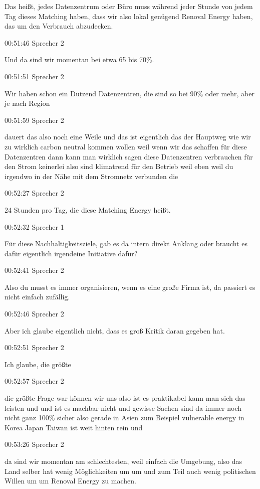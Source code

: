 Das heißt, jedes Datenzentrum oder Büro muss während jeder Stunde von
jedem Tag dieses Matching haben, dass wir also lokal genügend Renoval
Energy haben, das um den Verbrauch abzudecken.

00:51:46 Sprecher 2

Und da sind wir momentan bei etwa 65 bis 70\%.

00:51:51 Sprecher 2

Wir haben schon ein Dutzend Datenzentren, die sind so bei 90\% oder
mehr, aber je nach Region

00:51:59 Sprecher 2

dauert das also noch eine Weile und das ist eigentlich das der Hauptweg
wie wir zu wirklich carbon neutral kommen wollen weil wenn wir das
schaffen für diese Datenzentren dann kann man wirklich sagen diese
Datenzentren verbrauchen für den Strom keinerlei also sind klimatrend
für den Betrieb weil eben weil du irgendwo in der Nähe mit dem Stromnetz
verbunden die

00:52:27 Sprecher 2

24 Stunden pro Tag, die diese Matching Energy heißt.

00:52:32 Sprecher 1

Für diese Nachhaltigkeitsziele, gab es da intern direkt Anklang oder
braucht es dafür eigentlich irgendeine Initiative dafür?

00:52:41 Sprecher 2

Also du musst es immer organisieren, wenn es eine große Firma ist, da
passiert es nicht einfach zufällig.

00:52:46 Sprecher 2

Aber ich glaube eigentlich nicht, dass es groß Kritik daran gegeben hat.

00:52:51 Sprecher 2

Ich glaube, die größte

00:52:57 Sprecher 2

die größte Frage war können wir uns also ist es praktikabel kann man
sich das leisten und und ist es machbar nicht und gewisse Sachen sind da
immer noch nicht ganz 100\% sicher also gerade in Asien zum Beispiel
vulnerable energy in Korea Japan Taiwan ist weit hinten rein und

00:53:26 Sprecher 2

da sind wir momentan am schlechtesten, weil einfach die Umgebung, also
das Land selber hat wenig Möglichkeiten um um und zum Teil auch wenig
politischen Willen um um Renoval Energy zu machen.

